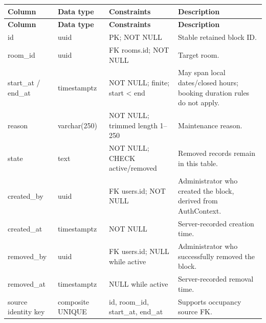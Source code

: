 \begin{longtable}{|p{}|p{}|p{}|p{}|}

\hline

\textbf{Column} & \textbf{Data type} & \textbf{Constraints} & \textbf{Description} \\ \hline

\endfirsthead

\hline

\textbf{Column} & \textbf{Data type} & \textbf{Constraints} & \textbf{Description} \\ \hline

\endhead

id & uuid & PK; NOT NULL & Stable retained block ID. \\ \hline

room\allowbreak\_\allowbreak{}id & uuid & FK rooms.id; NOT NULL & Target room. \\ \hline

start\allowbreak\_\allowbreak{}at /\allowbreak{} end\allowbreak\_\allowbreak{}at & timestamptz & NOT NULL; finite; start < end & May span local dates/\allowbreak{}closed hours; booking duration rules do not apply. \\ \hline

reason & varchar(250) & NOT NULL; trimmed length 1–250 & Maintenance reason. \\ \hline

state & text & NOT NULL; CHECK active/\allowbreak{}removed & Removed records remain in this table. \\ \hline

created\allowbreak\_\allowbreak{}by & uuid & FK users.id; NOT NULL & Administrator who created the block, derived from AuthContext. \\ \hline

created\allowbreak\_\allowbreak{}at & timestamptz & NOT NULL & Server-recorded creation time. \\ \hline

removed\allowbreak\_\allowbreak{}by & uuid & FK users.id; NULL while active & Administrator who successfully removed the block. \\ \hline

removed\allowbreak\_\allowbreak{}at & timestamptz & NULL while active & Server-recorded removal time. \\ \hline

source identity key & composite UNIQUE & id, room\allowbreak\_\allowbreak{}id, start\allowbreak\_\allowbreak{}at, end\allowbreak\_\allowbreak{}at & Supports occupancy source FK. \\ \hline

\end{longtable}

